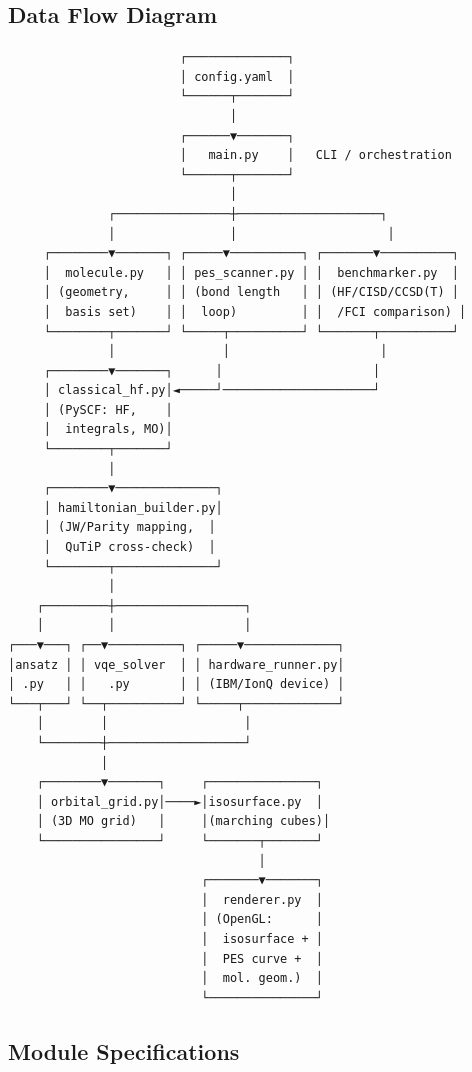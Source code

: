 \documentclass[
  11pt,
]{report}
\begin{document}
\subsection{Data Flow Diagram}\label{data-flow-diagram}

\begin{verbatim}
                        ┌──────────────┐
                        │ config.yaml  │
                        └──────┬───────┘
                               │
                        ┌──────▼───────┐
                        │   main.py    │   CLI / orchestration
                        └──────┬───────┘
                               │
              ┌────────────────┼────────────────────┐
              │                │                     │
     ┌────────▼───────┐ ┌─────▼──────────┐ ┌───────▼──────────┐
     │  molecule.py   │ │ pes_scanner.py │ │  benchmarker.py  │
     │ (geometry,     │ │ (bond length   │ │ (HF/CISD/CCSD(T) │
     │  basis set)    │ │  loop)         │ │  /FCI comparison) │
     └────────┬───────┘ └─────┬──────────┘ └───────┬──────────┘
              │               │                     │
     ┌────────▼───────┐      │                     │
     │ classical_hf.py│◄─────┘─────────────────────┘
     │ (PySCF: HF,    │
     │  integrals, MO)│
     └────────┬───────┘
              │
     ┌────────▼──────────────┐
     │ hamiltonian_builder.py│
     │ (JW/Parity mapping,  │
     │  QuTiP cross-check)  │
     └────────┬──────────────┘
              │
    ┌─────────┼──────────────────┐
    │         │                  │
┌───▼───┐ ┌──▼──────────┐ ┌─────▼─────────────┐
│ansatz │ │ vqe_solver  │ │ hardware_runner.py│
│ .py   │ │   .py       │ │ (IBM/IonQ device) │
└───┬───┘ └──┬──────────┘ └─────┬─────────────┘
    │        │                   │
    └────────┼───────────────────┘
             │
    ┌────────▼───────┐     ┌───────────────┐
    │ orbital_grid.py│────►│isosurface.py  │
    │ (3D MO grid)   │     │(marching cubes)│
    └────────────────┘     └───────┬───────┘
                                   │
                           ┌───────▼───────┐
                           │  renderer.py  │
                           │ (OpenGL:      │
                           │  isosurface + │
                           │  PES curve +  │
                           │  mol. geom.)  │
                           └───────────────┘
\end{verbatim}

\subsection{Module Specifications}\label{module-specifications}
\end{document}
